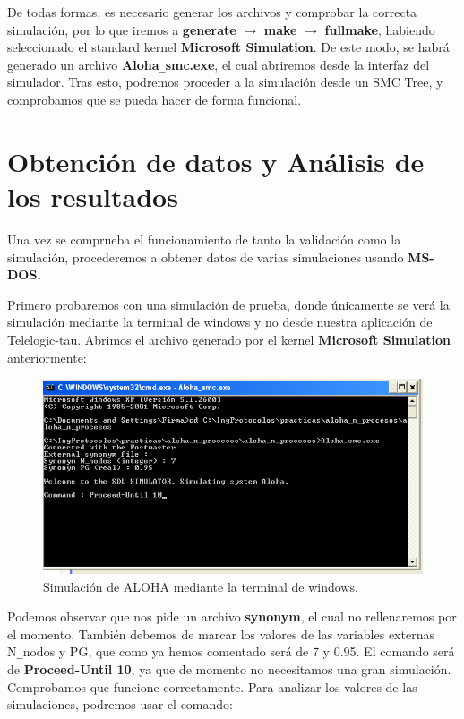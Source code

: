 \documentclass{article}
\begin{document}
\quad

De todas formas, es necesario generar los archivos y comprobar la correcta simulación, por lo que iremos a \textbf{generate} $\rightarrow$ \textbf{make} $\rightarrow$ \textbf{fullmake}, habiendo seleccionado el standard kernel \textbf{Microsoft Simulation}. De este modo, se habrá generado un archivo \textbf{Aloha}\verb|_|\textbf{smc.exe}, el cual abriremos desde la interfaz del simulador. Tras esto, podremos proceder a la simulación desde un SMC Tree, y comprobamos que se pueda hacer de forma funcional.


\section{Obtención de datos y Análisis de los resultados}

Una vez se comprueba el funcionamiento de tanto la validación como la simulación, procederemos a obtener datos de varias simulaciones usando \textbf{MS-DOS.}

Primero probaremos con una simulación de prueba, donde únicamente se verá la simulación mediante la terminal de windows y no desde nuestra aplicación de Telelogic-tau. Abrimos el archivo generado por el kernel \textbf{Microsoft Simulation} anteriormente:

\quad

\begin{figure}[h]
    \centering
    \includegraphics[width=0.85\linewidth]{src/cmd.png}
    \caption{\label{fig:cmdcaptura} Simulación de ALOHA mediante la terminal de windows.}
\end{figure}

Podemos observar que nos pide un archivo \textbf{synonym}, el cual no rellenaremos por el momento. También debemos de marcar los valores de las variables externas N\verb|_|nodos y PG, que como ya hemos comentado será de 7 y 0.95. El comando será de \textbf{Proceed-Until 10}, ya que de momento no necesitamos una gran simulación. Comprobamos que funcione correctamente. Para analizar los valores de las simulaciones, podremos usar el comando:
\end{document}
